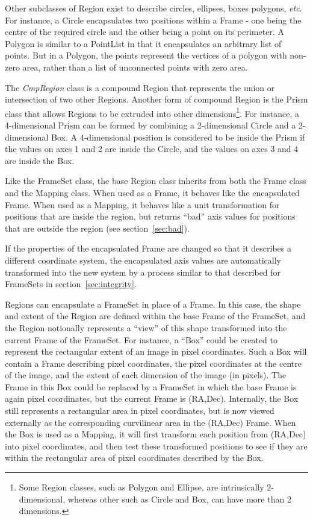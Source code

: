 \documentclass[final,authoryear,5p,times,twocolumn]{elsarticle}
\begin{document}
Other subclasses of Region exist to describe circles, ellipses, boxes
polygons, \emph{etc}. For instance, a Circle encapsulates two positions
within a Frame - one being the centre of the required circle and the
other being a point on its perimeter. A Polygon is similar to a PointList
in that it encapsulates an arbitrary list of points. But in a Polygon,
the points represent the vertices of a polygon with non-zero area, rather
than a list of unconnected points with zero area.

The \emph{CmpRegion} class is a compound Region that represents the
union or intersection of two other Regions.  Another form of compound
Region is the Prism class that allows Regions to be extruded into other
dimensions\footnote{Some Region classes, such as Polygon and Ellipse, are
intrinsically 2-dimensional, whereas other such as Circle and Box, can
have more than 2 dimensions.}. For instance, a 4-dimensional Prism can be
formed by combining a 2-dimensional Circle and a 2-dimensional Box. A
4-dimensional position is considered to be inside the Prism if the values
on axes 1 and 2 are inside the Circle, and the values on axes 3 and 4 are
inside the Box.

Like the FrameSet class, the base Region class inherits from both the
Frame class and the Mapping class. When used as a Frame, it behaves like
the encapsulated Frame. When used as a Mapping, it behaves like a unit
transformation for positions that are inside the region, but returns
``bad'' axis values for positions that are outside the region (see
section~\ref{sec:bad}).

If the properties of the encapsulated Frame are changed so that it
describes a different coordinate system, the encapsulated axis values are
automatically transformed into the new system by a process similar to
that described for FrameSets in section~\ref{sec:integrity}.

Regions can encapsulate a FrameSet in place of a Frame. In this case, the
shape and extent of the Region are defined within the base Frame of the
FrameSet, and the Region notionally represents a ``view'' of this shape
transformed into the current Frame of the FrameSet. For instance, a
``Box'' could be created to represent the rectangular extent of an image
in pixel coordinates. Such a Box will contain a Frame describing pixel
coordinates, the pixel coordinates at the centre of the image, and the
extent of each dimension of the image (in pixels). The Frame in this Box
could be replaced by a FrameSet in which the base Frame is again pixel
coordinates, but the current Frame is (RA,Dec). Internally, the Box still
represents a rectangular area in pixel coordinates, but is now viewed
externally as the corresponding curvilinear area in the (RA,Dec) Frame.
When the Box is used as a Mapping, it will first transform each position
from (RA,Dec) into pixel coordinates, and then test these transformed
positions to see if they are within the rectangular area of pixel
coordinates described by the Box.
\end{document}
